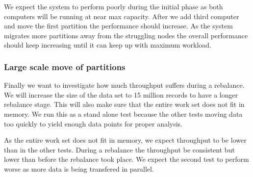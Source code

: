 We expect the system to perform poorly during the initial phase as both computers will be running at near max capacity. After we add third computer and move the first partition the performance should increase. As the system migrates more partitions away from the struggling nodes the overall performance should keep increasing until it can keep up with maximum workload. 

\subsubsection{Large scale move of partitions}
Finally we want to investigate how much throughput suffers during a rebalance. We will increase the size of the data set to 15 million records to have a longer rebalance stage. This will also make sure that the entire work set does not fit in memory. We run this as a stand alone test because the other tests moving data too quickly to yield enough data points for proper analysis. 

As the entire work set does not fit in memory, we expect throughput to be lower than in the other tests. During a rebalance the throughput be consistent but lower than before the rebalance took place. We expect the second test to perform worse as more data is being transfered in parallel. 










